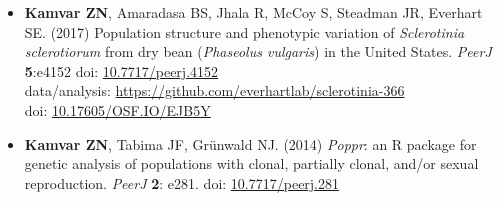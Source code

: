 \begin{itemize}
  \item \textbf{Kamvar ZN}, Amaradasa BS, Jhala R, McCoy S, Steadman JR,
  Everhart SE. (2017) Population structure and phenotypic variation of
  \textit{Sclerotinia sclerotiorum} from dry bean (\textit{Phaseolus vulgaris})
  in the United States. \textit{PeerJ} \textbf{5}:e4152 doi: \href{https://doi.org/10.7717/peerj.4152}{10.7717/peerj.4152}\\
  data/analysis: \href{https://github.com/everhartlab/sclerotinia-366#readme}{https://github.com/everhartlab/sclerotinia-366}\\
  doi:\phantom{t/analysis:}
  \href{https://doi.org/10.17605/OSF.IO/EJB5Y}{10.17605/OSF.IO/EJB5Y}

  \item \textbf{Kamvar ZN}, Tabima JF, Gr\"unwald NJ. (2014) \textit{Poppr}: an
  R package for genetic analysis of populations with clonal, partially clonal,
  and/or sexual reproduction. \textit{PeerJ} \textbf{2}: e281. doi: \href{https://doi.org/10.7717/peerj.281}{10.7717/peerj.281}
\end{itemize}



